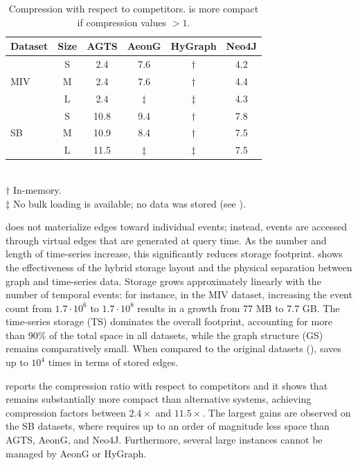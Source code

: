 \begin{table}[t]
\begin{subtable}[t]{\columnwidth}
\centering
\caption{Compression with respect to competitors.
\ourapproach is more compact if compression values $>1$.}
\label{tab:compression-competitors}
\begin{tabular}{lccccc}
\toprule
Dataset & Size & AGTS & AeonG & HyGraph & Neo4J \\
\midrule
\multirow{3}{*}{\textsf{MIV}}
 & S & 2.4 & 7.6 & $\dagger$ & 4.2 \\
 & M & 2.4 & 7.6 & $\dagger$ & 4.4 \\
 & L & 2.4 & $\ddagger$ & $\ddagger$ & 4.3 \\
\midrule
\multirow{3}{*}{\textsf{SB}}
 & S & 10.8 & 9.4 & $\dagger$ & 7.8 \\
 & M & 10.9 & 8.4 & $\dagger$ & 7.5 \\
 & L & 11.5 & $\ddagger$ & $\ddagger$ & 7.5 \\
\bottomrule
\end{tabular}
\\
$\dagger$ In-memory. \\
$\ddagger$ No bulk loading is available; no data was stored (see ).
\end{subtable}
\end{table}

\ourapproach does not materialize edges toward individual events; instead, events are accessed through virtual edges that are generated at query time.
As the number and length of time-series increase, this significantly reduces storage footprint.
 shows the effectiveness of the hybrid storage layout and the physical separation between graph and time-series data.
Storage grows approximately linearly with the number of temporal events: for instance, in the MIV dataset, increasing the event count from $1.7\cdot10^6$ to $1.7\cdot10^8$ results in a growth from 77 MB to 7.7 GB. 
The time-series storage (TS) dominates the overall footprint, accounting for more than 90\% of the total space in all datasets, while the graph structure (GS) remains comparatively small.
When compared to the original datasets (), \ourapproach saves up to $10^4$ times in terms of stored edges.

 reports the compression ratio with respect to competitors and it shows that \ourapproach remains substantially more compact than alternative systems, achieving compression factors between $2.4\times$ and $11.5\times$.
The largest gains are observed on the SB datasets, where \ourapproach requires up to an order of magnitude less space than AGTS, AeonG, and Neo4J.
Furthermore, several large instances cannot be managed by AeonG or HyGraph.

